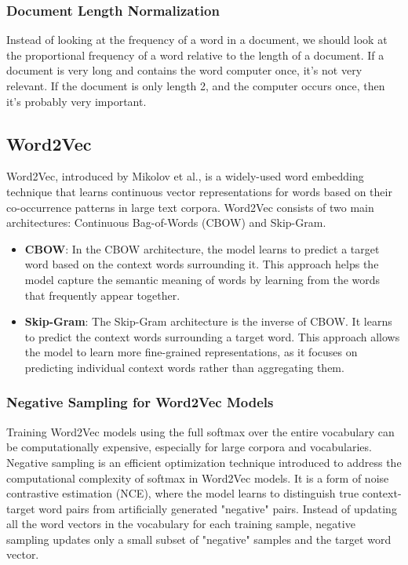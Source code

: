 \documentclass[12pt]{article}
\begin{document}
\subsubsection{Document Length Normalization}
Instead of looking at the frequency of a word in a document, we should look at the proportional frequency of a word relative to the length of a document. If a document is very long and contains the word computer once, it's not very relevant. If the document is only length 2, and the computer occurs once, then it's probably very important. 

\subsection{Word2Vec}

Word2Vec, introduced by Mikolov et al., is a widely-used word embedding technique that learns continuous vector representations for words based on their co-occurrence patterns in large text corpora. Word2Vec consists of two main architectures: Continuous Bag-of-Words (CBOW) and Skip-Gram.

\begin{itemize}
\item \textbf{CBOW}: In the CBOW architecture, the model learns to predict a target word based on the context words surrounding it. This approach helps the model capture the semantic meaning of words by learning from the words that frequently appear together.
\item \textbf{Skip-Gram}: The Skip-Gram architecture is the inverse of CBOW. It learns to predict the context words surrounding a target word. This approach allows the model to learn more fine-grained representations, as it focuses on predicting individual context words rather than aggregating them.
\end{itemize}

\subsubsection{Negative Sampling for Word2Vec Models}

Training Word2Vec models using the full softmax over the entire vocabulary can be computationally expensive, especially for large corpora and vocabularies. Negative sampling is an efficient optimization technique introduced to address the computational complexity of softmax in Word2Vec models. It is a form of noise contrastive estimation (NCE), where the model learns to distinguish true context-target word pairs from artificially generated "negative" pairs. Instead of updating all the word vectors in the vocabulary for each training sample, negative sampling updates only a small subset of "negative" samples and the target word vector.
\end{document}

